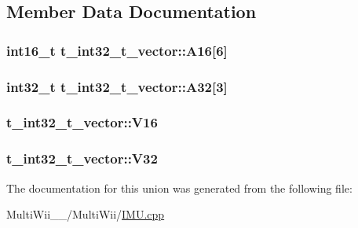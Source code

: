 \subsection{Member Data Documentation}
\hypertarget{uniont__int32__t__vector_af868e3eb6d6d95b59f6eed8fd5ccf4b7}{
\subsubsection[{A16}]{\setlength{\rightskip}{0pt plus 5cm}int16\-\_\-t t\-\_\-int32\-\_\-t\-\_\-vector\-::\-A16\mbox{[}6\mbox{]}}}\label{uniont__int32__t__vector_af868e3eb6d6d95b59f6eed8fd5ccf4b7}
\hypertarget{uniont__int32__t__vector_a8abb634c0688eea7ed99fed47a0d602b}{
\subsubsection[{A32}]{\setlength{\rightskip}{0pt plus 5cm}int32\-\_\-t t\-\_\-int32\-\_\-t\-\_\-vector\-::\-A32\mbox{[}3\mbox{]}}}\label{uniont__int32__t__vector_a8abb634c0688eea7ed99fed47a0d602b}
\hypertarget{uniont__int32__t__vector_a2a3cdb59dbae64449de64254d0fc122a}{
\subsubsection[{V16}]{ t\-\_\-int32\-\_\-t\-\_\-vector\-::\-V16}}\label{uniont__int32__t__vector_a2a3cdb59dbae64449de64254d0fc122a}
\hypertarget{uniont__int32__t__vector_a7b266851a313a5836f7a4724523bef60}{
\subsubsection[{V32}]{ t\-\_\-int32\-\_\-t\-\_\-vector\-::\-V32}}\label{uniont__int32__t__vector_a7b266851a313a5836f7a4724523bef60}


The documentation for this union was generated from the following file\-:\begin{DoxyCompactItemize}
\item 
Multi\-Wii\-\_\-\_/\-Multi\-Wii/\hyperlink{IMU_8cpp}{I\-M\-U.\-cpp}\end{DoxyCompactItemize}
